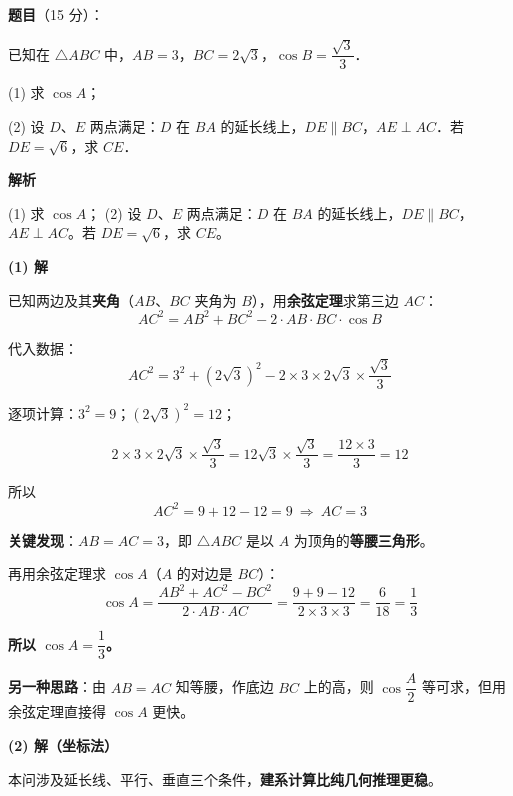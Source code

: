 \begin{answer}

\textbf{题目}（15 分）：

已知在 $\triangle ABC$ 中，$AB=3$，$BC=2\sqrt{3}$，$\cos B=\dfrac{\sqrt{3}}{3}$．

  (1) 求 $\cos A$；

  (2) 设 $D$、$E$ 两点满足：$D$ 在 $BA$ 的延长线上，$DE\parallel BC$，$AE\perp AC$．若 $DE=\sqrt{6}$，求 $CE$．

\textbf{解析}

  (1) 求 $\cos A$；
  (2) 设 $D$、$E$ 两点满足：$D$ 在 $BA$ 的延长线上，$DE\parallel BC$，$AE\perp AC$。若 $DE=\sqrt6$，求 $CE$。

\par\medskip

\textbf{(1) 解}

已知两边及其\textbf{夹角}（$AB$、$BC$ 夹角为 $B$），用\textbf{余弦定理}求第三边 $AC$：
\nopagebreak[4]
\[AC^2=AB^2+BC^2-2\cdot AB\cdot BC\cdot\cos B\]

代入数据：
\nopagebreak[4]
\[AC^2=3^2+\left(2\sqrt3\right)^2-2\times3\times2\sqrt3\times\frac{\sqrt3}{3}\]

逐项计算：$3^2=9$；$\left(2\sqrt3\right)^2=12$；

\nopagebreak[4]
\[2\times3\times2\sqrt3\times\frac{\sqrt3}{3}=12\sqrt3\times\frac{\sqrt3}{3}=\frac{12\times3}{3}=12\]

所以
\nopagebreak[4]
\[AC^2=9+12-12=9\ \Longrightarrow\ AC=3\]

\textbf{关键发现}：$AB=AC=3$，即 $\triangle ABC$ 是以 $A$ 为顶角的\textbf{等腰三角形}。

再用余弦定理求 $\cos A$（$A$ 的对边是 $BC$）：
\nopagebreak[4]
\[\cos A=\frac{AB^2+AC^2-BC^2}{2\cdot AB\cdot AC}=\frac{9+9-12}{2\times3\times3}=\frac{6}{18}=\frac13\]

\textbf{所以 $\cos A=\dfrac13$。}

\begin{gktip}
\textbf{另一种思路}：由 $AB=AC$ 知等腰，作底边 $BC$ 上的高，则 $\cos\dfrac{A}{2}$ 等可求，但用余弦定理直接得 $\cos A$ 更快。
\end{gktip}

\par\medskip

\textbf{(2) 解（坐标法）}

本问涉及延长线、平行、垂直三个条件，\textbf{建系计算比纯几何推理更稳}。


\end{answer}
